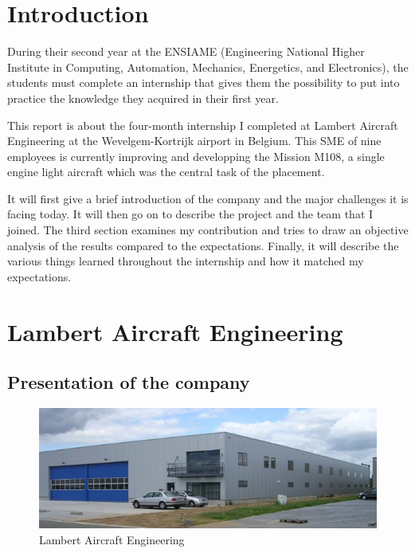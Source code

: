 \documentclass[11pt,a4paper]{article}
\begin{document}
\section{Introduction}

During their second year at the ENSIAME (Engineering National Higher Institute in Computing, Automation, Mechanics, Energetics, and Electronics), the students must complete an internship that gives them the possibility to put into practice the knowledge they acquired in their first year.

\bigskip

This report is about the four-month internship I completed at Lambert Aircraft Engineering at the Wevelgem-Kortrijk airport in Belgium. This SME of nine employees is currently improving and developping the Mission M108, a single engine light aircraft which was the central task of the placement.

\bigskip

It will first give a brief introduction of the company and the major challenges it is facing today. It will then go on to describe the project and the team that I joined. The third section examines my contribution and tries to draw an objective analysis of the results compared to the expectations. Finally, it will describe the various things learned throughout the internship and how it matched my expectations.

\newpage

\section{Lambert Aircraft Engineering}

\subsection{Presentation of the company}

\begin{figure}[ht!]
	\begin{center}
		\includegraphics[width=15cm]{pics/PIC001.jpg}
		\caption{Lambert Aircraft Engineering}
		\label{fig:PIC001}
	\end{center}
\end{figure}
\end{document}
